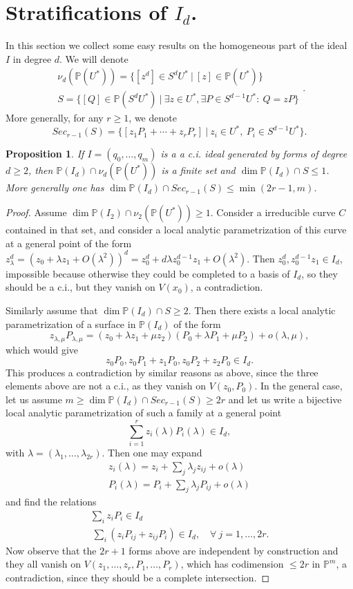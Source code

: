 \documentclass[10pt, a4paper]{amsart}
\theoremstyle{plain}
\newtheorem{prop}{Proposition}
\theoremstyle{definition}
\theoremstyle{remark}
\def\PP{\mathbb{P}}
\begin{document}
 \section{Stratifications of $I_d$.}\label{sec:red_I2}
 In this section we collect some easy results on the homogeneous part of the ideal $I$ in degree $d$.
 We will denote $$\begin{array}{l}
 \nu_d(\PP(U^\ast))=\{[z^d]\in S^dU^\ast\ |\ [z]\in\PP(U^\ast)\}\\
 S=\{[Q]\in \PP(S^dU^\ast)\ |\ \exists z\in U^\ast,\exists P\in S^{d-1}U^\ast:\ Q=zP\}\end{array}.$$ More generally, for any $r\geq 1$, we denote 
 $$Sec_{r-1}(S)=\{[z_1P_1+\cdots+z_rP_r]\ |\ z_i\in U^\ast,\ P_i\in S^{d-1}U^\ast\}.$$
 \begin{prop}\label{prop:I_d} If $I=(q_0,\ldots,q_m)$ is a a c.i. ideal generated by forms of degree $d\geq 2$, then  $ \PP(I_d)\cap\nu_d(\PP(U^\ast))$ is a finite set and $\dim \PP(I_d)\cap S\leq 1$. More generally one has $\dim \PP(I_d)\cap Sec_{r-1}(S)\leq \min(2r-1,m)$.
 \end{prop}
 \begin{proof}  Assume $\dim  \PP(I_2)\cap\nu_2(\PP(U^\ast))\geq 1$. Consider a irreducible curve $C$ contained in that set, and consider a local analytic parametrization of this curve at a general point of the form $z_\lambda^d=(z_0+\lambda z_1+O(\lambda^2))^d=z_0^d+d\lambda z_0^{d-1}z_1+O(\lambda^2)$. Then $z_0^d, z_0^{d-1}z_1\in I_d$, impossible because otherwise they could be completed to a basis of $I_d$, so they should be a c.i., but they vanish on $V(x_0)$, a contradiction.
 
  Similarly assume that $\dim \PP(I_d)\cap S\geq 2$. Then there exists a local analytic parametrization of a surface in $\PP(I_d)$ of the form
  $$z_{\lambda,\mu}P_{\lambda,\mu}=(z_0+\lambda z_1+\mu z_2)(P_0+\lambda P_1+\mu P_2)+o(\lambda,\mu),$$ which would give
  $$z_0P_0, z_0P_1+z_1P_0,z_0P_2+z_2P_0 \in I_d.$$
  This produces a contradiction by similar reasons as above, since the three elements above are not a c.i., as they vanish on $V(z_0,P_0)$.
  In the general case, let us assume $m\geq \dim \PP(I_d)\cap Sec_{r-1}(S)\geq 2r$ and let us write a bijective local analytic parametrization  of such a family at a general point  $$\sum_{i=1}^{r}z_i(\lambda)P_i(\lambda)\in I_d,$$ with $\lambda=(\lambda_1,\ldots,\lambda_{2r})$. Then one may expand $$\begin{array}{l} z_i(\lambda)=z_i+\sum_j\lambda_j z_{ij}+o(\lambda)\\ P_i(\lambda)=P_i+\sum_j\lambda_j P_{ij}+o(\lambda)\end{array}$$ and find the relations $$\begin{array}{l} \sum_i z_iP_i\in I_d \\\
  \sum_i(z_iP_{ij}+z_{ij}P_i)\in I_d,\quad \forall\ j=1,\ldots,2r.\end{array}$$
Now observe that the $2r+1$ forms above are independent by construction and they all vanish on $V(z_1,\ldots,z_r,P_1,\ldots,P_r)$, which has codimension $\leq 2r$ in $\PP^m$, a contradiction, since they should be a complete intersection. \end{proof}
\end{document}
